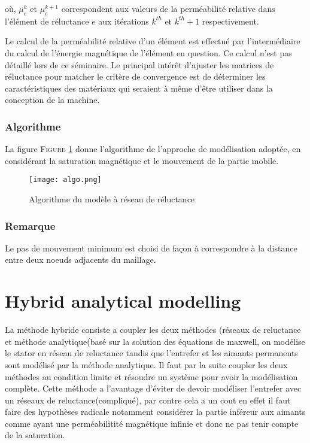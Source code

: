 où, $\mu_e^k$ et $\mu_e^{k+1}$ correspondent aux valeurs de la perméabilité relative dans l'élément de réluctance $e$ aux itérations $k^{th}$ et $k^{th}+1$ respectivement.

Le calcul de la perméabilité relative d’un élément est effectué par l’intermédiaire du calcul de
l’énergie magnétique de l’élément en question. Ce calcul n'est pas détaillé lors de ce séminaire.
Le principal intérêt d'ajuster les matrices de réluctance pour matcher le critère de convergence est de déterminer les caractéristiques des matériaux qui seraient à même d'être utiliser dans la conception de la machine. 

\subsubsection{Algorithme}
La figure \textsc{Figure \ref{algo}} donne l’algorithme de l’approche de modélisation adoptée, en considérant la
saturation magnétique et le mouvement de la partie mobile. 

\begin{figure}[H]
    \centering
    \texttt{[image: algo.png]}
    \caption{Algorithme du modèle à réseau de réluctance}
    \label{algo}
\end{figure}

\subsubsection*{Remarque}
Le pas de mouvement minimum est choisi de façon à correspondre à la distance entre deux noeuds adjacents du maillage.


\section{Hybrid analytical modelling}
La méthode hybride consiste a coupler les deux méthodes (réseaux de reluctance et méthode analytique(basé sur la solution des équations de maxwell, on modélise le stator en réseau de reluctance tandis que l'entrefer et les aimants permanents sont modélisé par la méthode analytique. Il faut par la suite coupler les deux méthodes au condition limite et résoudre un système pour avoir la modélisation complète. Cette méthode a l'avantage d'éviter de devoir modéliser l'entrefer avec un réseaux de reluctance(compliqué), par contre cela a un cout en effet il faut faire des hypothèses radicale notamment considérer la partie inféreur aux aimants comme ayant une perméabilitité magnétique infinie et donc ne pas tenir compte de la saturation.
